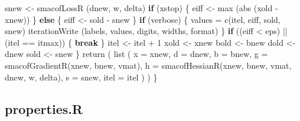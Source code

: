 \documentclass[
  12pt,
  letterpaper,
  DIV=11,
  numbers=noendperiod]{scrreprt}
\newenvironment{Shaded}{\begin{snugshade}}{\end{snugshade}}
\newcommand{\AttributeTok}[1]{\textcolor[rgb]{0.40,0.45,0.13}{#1}}
\newcommand{\ControlFlowTok}[1]{\textcolor[rgb]{0.00,0.23,0.31}{\textbf{#1}}}
\newcommand{\DecValTok}[1]{\textcolor[rgb]{0.68,0.00,0.00}{#1}}
\newcommand{\FunctionTok}[1]{\textcolor[rgb]{0.28,0.35,0.67}{#1}}
\newcommand{\NormalTok}[1]{\textcolor[rgb]{0.00,0.23,0.31}{#1}}
\newcommand{\OtherTok}[1]{\textcolor[rgb]{0.00,0.23,0.31}{#1}}
\newcommand{\SpecialCharTok}[1]{\textcolor[rgb]{0.37,0.37,0.37}{#1}}
\theoremstyle{remark}
\begin{document}
\begin{Shaded}
\begin{Highlighting}[]
\NormalTok{      snew }\OtherTok{\textless{}{-}} \FunctionTok{smacofLossR}\NormalTok{ (dnew, w, delta)}
      \ControlFlowTok{if}\NormalTok{ (xstop) \{}
\NormalTok{        eiff }\OtherTok{\textless{}{-}} \FunctionTok{max}\NormalTok{ (}\FunctionTok{abs}\NormalTok{ (xold }\SpecialCharTok{{-}}\NormalTok{ xnew))}
\NormalTok{      \} }\ControlFlowTok{else}\NormalTok{ \{}
\NormalTok{        eiff }\OtherTok{\textless{}{-}}\NormalTok{ sold }\SpecialCharTok{{-}}\NormalTok{ snew}
\NormalTok{      \}}
      \ControlFlowTok{if}\NormalTok{ (verbose) \{}
\NormalTok{        values }\OtherTok{=} \FunctionTok{c}\NormalTok{(itel, eiff, sold, snew)}
        \FunctionTok{iterationWrite}\NormalTok{ (labels, values, digits, widths, format)}
\NormalTok{      \}}
      \ControlFlowTok{if}\NormalTok{ ((eiff }\SpecialCharTok{\textless{}}\NormalTok{ eps) }\SpecialCharTok{||}\NormalTok{ (itel }\SpecialCharTok{==}\NormalTok{ itmax)) \{}
        \ControlFlowTok{break}
\NormalTok{      \}}
\NormalTok{      itel }\OtherTok{\textless{}{-}}\NormalTok{ itel }\SpecialCharTok{+} \DecValTok{1}
\NormalTok{      xold }\OtherTok{\textless{}{-}}\NormalTok{ xnew}
\NormalTok{      bold }\OtherTok{\textless{}{-}}\NormalTok{ bnew}
\NormalTok{      dold }\OtherTok{\textless{}{-}}\NormalTok{ dnew}
\NormalTok{      sold }\OtherTok{\textless{}{-}}\NormalTok{ snew}
\NormalTok{    \}}
    \FunctionTok{return}\NormalTok{ (}
      \FunctionTok{list}\NormalTok{ (}
        \AttributeTok{x =}\NormalTok{ xnew,}
        \AttributeTok{d =}\NormalTok{ dnew,}
        \AttributeTok{b =}\NormalTok{ bnew,}
        \AttributeTok{g =} \FunctionTok{smacofGradientR}\NormalTok{(xnew, bnew, vmat),}
        \AttributeTok{h =} \FunctionTok{smacofHessianR}\NormalTok{(xnew, bnew, vmat, dnew, w, delta),}
        \AttributeTok{s =}\NormalTok{ snew,}
        \AttributeTok{itel =}\NormalTok{ itel}
\NormalTok{      )}
\NormalTok{    )}
\NormalTok{  \}}
\end{Highlighting}
\end{Shaded}

\subsection*{properties.R}\label{apcodeprop}
\end{document}
